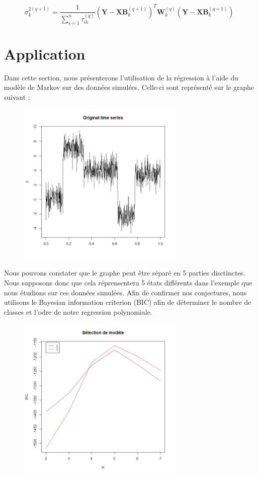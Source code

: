\documentclass[11pt]{article}
\newcommand{\bsW}{\boldsymbol{W}}
\newcommand{\sumn}{\sum_{i=1}^{n}}
\newcommand{\bX}{\mathbf{X}}
\newcommand{\bY}{\mathbf{Y}}
\newcommand{\bB}{\mathbf{B}}
\begin{document}
\begin{equation}
\sigma_{k}^{2(q+1)}= \frac{1}{\sumn \tau_{ik}^{(q)}} (\bY - \bX \bB_{k}^{(q+1)})^{T} \bsW_{k}^{(q)}( \bY - \bX \bB_{k}^{(q+1)})
\end{equation}

\newpage
\section{Application}

Dans cette section, nous présenterons l'utilisation de la régression à l'aide du modèle de Markov sur des données simulées. Celle-ci sont représenté sur le graphe suivant : \\

\begin{figure}[h]
\begin{center}
\includegraphics[height=8cm]{data.png}
\end{center}
\end{figure}

Nous pouvons constater que le graphe peut être séparé en 5 parties disctinctes. Nous supposons donc que cela réprensentera 5 états différents dans l'exemple que nous étudions sur ces données simulées. Afin de confirmer nos conjectures, nous utilisons le Bayesian information criterion (BIC) afin de déterminer le nombre de classes et l'odre de notre regression polynomiale. \\


\begin{figure}[h]
\begin{center}
\includegraphics[height=8cm]{bic.png}
\end{center}
\end{figure}
\end{document}
